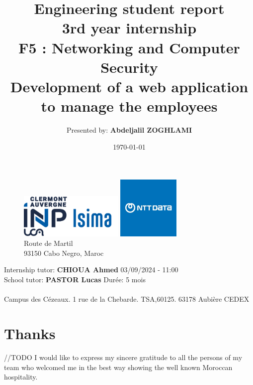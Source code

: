 \documentclass[12pt,a4paper,table,english]{article}
\title{Engineering student report\\
	3rd year internship\\
	F5 : Networking and Computer Security\\
	\textbf{Development of a web application to manage the employees}}
\author{Presented by: \textbf{Abdeljalil ZOGHLAMI}}
\date{\today}
\begin{document}
	\begin{figure}[t]
		\begin{minipage}[t]{0.5\textwidth}
			\centering
			\includegraphics[width=50mm]{Image/Logo_ISIMA_INP.png}
		\end{minipage}%
		\begin{minipage}[t]{0.5\textwidth}
			\centering
			\includegraphics[width=30mm]{Image/Logo_NTT-DATA.png}
			\caption*{Route de Martil\\ 93150 Cabo Negro, Maroc}
		\end{minipage}
	\end{figure}
	
		
	\maketitle
	
	
	\thispagestyle{empty}
	
	\vfill 
	\noindent Internship tutor: \textbf{CHIOUA Ahmed}
	\hfill %
	03/09/2024 - 11:00 \\
	\noindent School tutor: \textbf{PASTOR Lucas}
	\hfill %
	Durée: 5 mois\\
	\vspace{5pt}\\
	\noindent Campus des Cézeaux. 1 rue de la Chebarde. TSA,60125. 63178 Aubière CEDEX
	
	\newpage
	\section{Thanks}
	
	//TODO
	\vspace{10mm}
	I would like to express my sincere gratitude to all the persons of my team who welcomed me in the best way showing the well known Moroccan hospitality.\\
	
\end{document}
